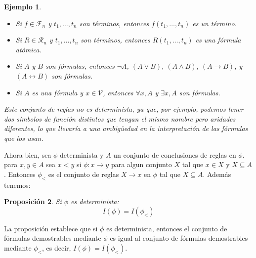 \documentclass[executivepaper]{article}
\newtheorem{propo}{Proposición}[section]
\newtheorem{ejemplo}[propo]{Ejemplo}
\begin{document}
\begin{ejemplo}
\begin{itemize}
\begin{itemize}
            \item Si $f \in \mathcal{F}_n$ y $t_1,\ldots,t_n$ son términos, entonces $f(t_1,\ldots,t_n)$ es un término.
            \item Si $R \in \mathcal{R}_n$ y $t_1,\ldots,t_n$ son términos, entonces $R(t_1,\ldots,t_n)$ es una fórmula atómica.
            \item Si $A$ y $B$ son fórmulas, entonces $\neg A$, $(A \vee B)$, $(A \wedge B)$, $(A \rightarrow B)$, y $(A \leftrightarrow B)$ son fórmulas.
            \item Si $A$ es una fórmula y $x \in \mathcal{V}$, entonces $\forall x,A$ y $\exists x,A$ son fórmulas.
        \end{itemize}
        Este conjunto de reglas no es determinista, ya que, por ejemplo, podemos tener dos símbolos de función distintos que tengan el mismo nombre pero aridades diferentes, lo que llevaría a una ambigüedad en la interpretación de las fórmulas que los usan.
    \end{itemize}
\end{ejemplo}

Ahora bien, sea $\phi$ determinista y $A$ un conjunto de conclusiones de reglas en $\phi$. para $x,y\in A$ sea $x<y$ si $\phi: x\rightarrow y$ para algun conjunto $X$ tal que $x\in X$ y $X\subseteq A$. Entonces $\phi_<$ es el conjunto de reglas $X\rightarrow x$ en $\phi$ tal que $X\subseteq A$. Además tenemos:
\begin{propo}
    Si $\phi$ es determinista:
    $$I(\phi)=I(\phi_<)$$
\end{propo}
La proposición establece que si $\phi$ es determinista, entonces el conjunto de fórmulas demostrables mediante $\phi$ es igual al conjunto de fórmulas demostrables mediante $\phi_<$, es decir, $I(\phi) = I(\phi_<)$.
\end{document}
